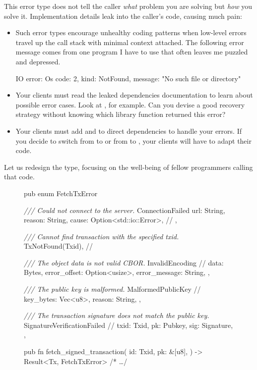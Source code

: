 \documentclass{article}
\begin{document}
This error type does not tell the caller \emph{what} problem you are solving but \emph{how} you solve it.
Implementation details leak into the caller's code, causing much pain:
\begin{itemize}
 \item
   Such error types encourage unhealthy coding patterns when low-level errors travel up the call stack with minimal context attached.
   The following error message comes from one program I have to use that often leaves me puzzled and depressed.
   \begin{code}[bad]IO error: Os { code: 2, kind: NotFound, message: "No such file or directory" }\end{code}
 \item
   Your clients must read the leaked dependencies documentation to learn about possible error cases.
   Look at \href{https://docs.rs/openssl/0.10.42/openssl/ssl/struct.Error.html}{}, for example.
   Can you devise a good recovery strategy without knowing which  library function returned this error?
 \item
   Your clients must add  and  to direct dependencies to handle your errors.
   If you decide to switch from  to  or from  to , your clients will have to adapt their code.
\end{itemize}

Let us redesign the  type, focusing on the well-being of fellow programmers calling that code.

\begin{figure}
\begin{code}[good]
pub enum FetchTxError {
  \emph{/// Could not connect to the server.}
  ConnectionFailed {
    url: String,
    reason: String,
    cause: Option<std::io::Error>, // 
  },

  \emph{/// Cannot find transaction with the specified txid.}
  TxNotFound(Txid), // 

  \emph{/// The object data is not valid CBOR.}
  InvalidEncoding { // 
    data: Bytes,
    error_offset: Option<usize>,
    error_message: String,
  },

  \emph{/// The public key is malformed.}
  MalformedPublicKey { // 
    key_bytes: Vec<u8>,
    reason: String,
  },

  \emph{/// The transaction signature does not match the public key.}
  SignatureVerificationFailed { // 
    txid: Txid,
    pk: Pubkey,
    sig: Signature,
  },
}

pub fn fetch_signed_transaction(
  id: Txid,
  pk: &[u8],
) -> Result<Tx, FetchTxError> { /* \ldots  */ }
\end{code}
\end{figure}
\end{document}
